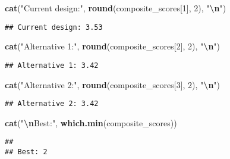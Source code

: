 \documentclass[
]{article}
\newenvironment{Shaded}{\begin{snugshade}}{\end{snugshade}}
\newcommand{\DecValTok}[1]{\textcolor[rgb]{0.00,0.00,0.81}{#1}}
\newcommand{\FunctionTok}[1]{\textcolor[rgb]{0.13,0.29,0.53}{\textbf{#1}}}
\newcommand{\NormalTok}[1]{#1}
\newcommand{\SpecialCharTok}[1]{\textcolor[rgb]{0.81,0.36,0.00}{\textbf{#1}}}
\newcommand{\StringTok}[1]{\textcolor[rgb]{0.31,0.60,0.02}{#1}}
\begin{document}
\begin{Shaded}
\begin{Highlighting}[]
\FunctionTok{cat}\NormalTok{(}\StringTok{"Current design:"}\NormalTok{, }\FunctionTok{round}\NormalTok{(composite\_scores[}\DecValTok{1}\NormalTok{], }\DecValTok{2}\NormalTok{), }\StringTok{"}\SpecialCharTok{\textbackslash{}n}\StringTok{"}\NormalTok{)}
\end{Highlighting}
\end{Shaded}

\begin{verbatim}
## Current design: 3.53
\end{verbatim}

\begin{Shaded}
\begin{Highlighting}[]
\FunctionTok{cat}\NormalTok{(}\StringTok{"Alternative 1:"}\NormalTok{, }\FunctionTok{round}\NormalTok{(composite\_scores[}\DecValTok{2}\NormalTok{], }\DecValTok{2}\NormalTok{), }\StringTok{"}\SpecialCharTok{\textbackslash{}n}\StringTok{"}\NormalTok{)}
\end{Highlighting}
\end{Shaded}

\begin{verbatim}
## Alternative 1: 3.42
\end{verbatim}

\begin{Shaded}
\begin{Highlighting}[]
\FunctionTok{cat}\NormalTok{(}\StringTok{"Alternative 2:"}\NormalTok{, }\FunctionTok{round}\NormalTok{(composite\_scores[}\DecValTok{3}\NormalTok{], }\DecValTok{2}\NormalTok{), }\StringTok{"}\SpecialCharTok{\textbackslash{}n}\StringTok{"}\NormalTok{)}
\end{Highlighting}
\end{Shaded}

\begin{verbatim}
## Alternative 2: 3.42
\end{verbatim}

\begin{Shaded}
\begin{Highlighting}[]
\FunctionTok{cat}\NormalTok{(}\StringTok{"}\SpecialCharTok{\textbackslash{}n}\StringTok{Best:"}\NormalTok{, }\FunctionTok{which.min}\NormalTok{(composite\_scores))}
\end{Highlighting}
\end{Shaded}

\begin{verbatim}
## 
## Best: 2
\end{verbatim}
\end{document}
